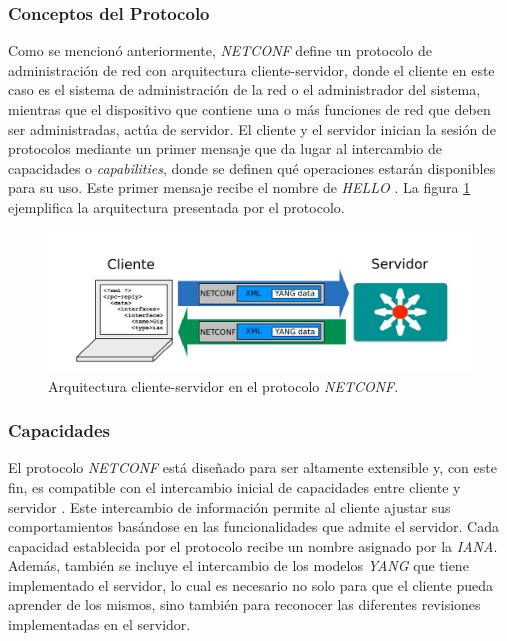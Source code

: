 \subsubsection{Conceptos del Protocolo}
Como se mencionó anteriormente, \textit{NETCONF} define un protocolo de administración de red con arquitectura cliente-servidor, donde el cliente en este caso es el sistema de administración de la red o el administrador del sistema, mientras que el dispositivo que contiene una o más funciones de red que deben ser administradas, actúa de servidor. El cliente y el servidor inician la sesión de protocolos mediante un primer mensaje que da lugar al intercambio de capacidades o \textit{capabilities}, donde se definen qué operaciones estarán disponibles para su uso. Este primer mensaje recibe el nombre de \textit{HELLO} \parencite{netconfrfcnuevo}. La figura \ref{fig:netconf_comunicacion} ejemplifica la arquitectura presentada por el protocolo.

\begin{figure}[htbp]
	\centering
	\includegraphics[scale=0.8]{Figures/netconf-cliente-servidor.pdf}
	\caption{Arquitectura cliente-servidor en el protocolo \textit{NETCONF}.}
	\label{fig:netconf_comunicacion}
  \end{figure}

  \subsubsection{Capacidades}
  El protocolo \textit{NETCONF} está diseñado para ser altamente extensible y, con este fin, es compatible con el intercambio inicial de capacidades entre cliente y servidor \parencite{netconfrfcnuevo}. Este intercambio de información permite al cliente ajustar sus comportamientos basándose en las funcionalidades que admite el servidor. Cada capacidad establecida por el protocolo recibe un nombre asignado por la \textit{IANA}. Además, también se incluye el intercambio de los modelos \textit{YANG} que tiene implementado el servidor, lo cual es necesario no solo para que el cliente pueda aprender de los mismos, sino también para reconocer las diferentes revisiones implementadas en el servidor. 
  \\

